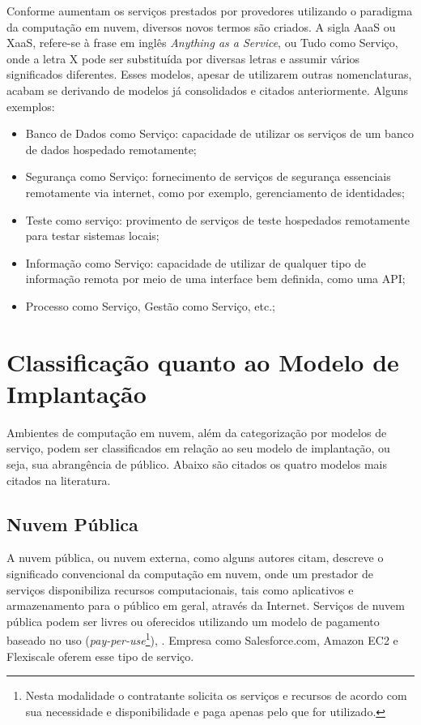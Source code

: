 Conforme aumentam os serviços prestados por provedores utilizando o paradigma da
computação em nuvem, diversos novos termos são criados. A sigla AaaS ou XaaS,
refere-se à frase em inglês \textit{Anything as a Service}, ou Tudo como
Serviço, onde a letra X pode ser substituída por diversas letras e assumir
vários significados diferentes. Esses modelos, apesar de utilizarem outras
nomenclaturas, acabam se derivando de modelos já consolidados e citados
anteriormente. Alguns exemplos:

\begin{itemize}
\setlength{\itemsep}{1pt}
\setlength{\parskip}{0pt}
\setlength{\parsep}{0pt}
\item Banco de Dados como Serviço: capacidade de utilizar os serviços de um
banco de dados hospedado remotamente;
\item Segurança como Serviço: fornecimento de serviços de segurança essenciais
remotamente via internet, como por exemplo, gerenciamento de identidades;
\item Teste como serviço: provimento de serviços de teste hospedados remotamente
para testar sistemas locais;
\item Informação como Serviço: capacidade de utilizar de qualquer tipo de
informação remota por meio de uma interface bem definida, como uma API;
\item Processo como Serviço, Gestão como Serviço, etc.;
\end{itemize}


\section{Classificação quanto ao Modelo de Implantação}
\label{computacaoemnuvem:classificacoes:implantacao}

Ambientes de computação em nuvem, além da categorização por modelos de serviço,
podem ser classificados em relação ao seu modelo de implantação, ou seja, sua
abrangência de público. Abaixo são citados os quatro modelos mais citados na
literatura.

\subsection{Nuvem Pública} 
\label{computacaoemnuvem:classificacoes:implantacao:publica}

A nuvem pública, ou nuvem externa, como alguns autores citam, descreve o
significado convencional da computação em nuvem, onde um prestador de serviços
disponibiliza recursos computacionais, tais como aplicativos e armazenamento
para o público em geral, através da Internet. Serviços de nuvem pública podem
ser livres ou oferecidos utilizando um modelo de pagamento baseado no uso
(\textit{pay-per-use}\footnote{Nesta modalidade o contratante solicita os
serviços e recursos de acordo com sua necessidade e disponibilidade e paga
apenas pelo que for utilizado.}), . Empresa  como
Salesforce.com, Amazon EC2 e Flexiscale oferem esse tipo de serviço.

